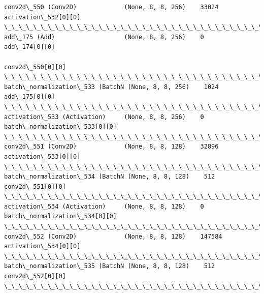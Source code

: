 \documentclass[11pt]{article}
\begin{document}
\begin{Verbatim}[commandchars=\\\{\}]
conv2d\_550 (Conv2D)             (None, 8, 8, 256)    33024       activation\_532[0][0]             
\_\_\_\_\_\_\_\_\_\_\_\_\_\_\_\_\_\_\_\_\_\_\_\_\_\_\_\_\_\_\_\_\_\_\_\_\_\_\_\_\_\_\_\_\_\_\_\_\_\_\_\_\_\_\_\_\_\_\_\_\_\_\_\_\_\_\_\_\_\_\_\_\_\_\_\_\_\_\_\_\_\_\_\_\_\_\_\_\_\_\_\_\_\_\_\_\_\_
add\_175 (Add)                   (None, 8, 8, 256)    0           add\_174[0][0]                    
                                                                 conv2d\_550[0][0]                 
\_\_\_\_\_\_\_\_\_\_\_\_\_\_\_\_\_\_\_\_\_\_\_\_\_\_\_\_\_\_\_\_\_\_\_\_\_\_\_\_\_\_\_\_\_\_\_\_\_\_\_\_\_\_\_\_\_\_\_\_\_\_\_\_\_\_\_\_\_\_\_\_\_\_\_\_\_\_\_\_\_\_\_\_\_\_\_\_\_\_\_\_\_\_\_\_\_\_
batch\_normalization\_533 (BatchN (None, 8, 8, 256)    1024        add\_175[0][0]                    
\_\_\_\_\_\_\_\_\_\_\_\_\_\_\_\_\_\_\_\_\_\_\_\_\_\_\_\_\_\_\_\_\_\_\_\_\_\_\_\_\_\_\_\_\_\_\_\_\_\_\_\_\_\_\_\_\_\_\_\_\_\_\_\_\_\_\_\_\_\_\_\_\_\_\_\_\_\_\_\_\_\_\_\_\_\_\_\_\_\_\_\_\_\_\_\_\_\_
activation\_533 (Activation)     (None, 8, 8, 256)    0           batch\_normalization\_533[0][0]    
\_\_\_\_\_\_\_\_\_\_\_\_\_\_\_\_\_\_\_\_\_\_\_\_\_\_\_\_\_\_\_\_\_\_\_\_\_\_\_\_\_\_\_\_\_\_\_\_\_\_\_\_\_\_\_\_\_\_\_\_\_\_\_\_\_\_\_\_\_\_\_\_\_\_\_\_\_\_\_\_\_\_\_\_\_\_\_\_\_\_\_\_\_\_\_\_\_\_
conv2d\_551 (Conv2D)             (None, 8, 8, 128)    32896       activation\_533[0][0]             
\_\_\_\_\_\_\_\_\_\_\_\_\_\_\_\_\_\_\_\_\_\_\_\_\_\_\_\_\_\_\_\_\_\_\_\_\_\_\_\_\_\_\_\_\_\_\_\_\_\_\_\_\_\_\_\_\_\_\_\_\_\_\_\_\_\_\_\_\_\_\_\_\_\_\_\_\_\_\_\_\_\_\_\_\_\_\_\_\_\_\_\_\_\_\_\_\_\_
batch\_normalization\_534 (BatchN (None, 8, 8, 128)    512         conv2d\_551[0][0]                 
\_\_\_\_\_\_\_\_\_\_\_\_\_\_\_\_\_\_\_\_\_\_\_\_\_\_\_\_\_\_\_\_\_\_\_\_\_\_\_\_\_\_\_\_\_\_\_\_\_\_\_\_\_\_\_\_\_\_\_\_\_\_\_\_\_\_\_\_\_\_\_\_\_\_\_\_\_\_\_\_\_\_\_\_\_\_\_\_\_\_\_\_\_\_\_\_\_\_
activation\_534 (Activation)     (None, 8, 8, 128)    0           batch\_normalization\_534[0][0]    
\_\_\_\_\_\_\_\_\_\_\_\_\_\_\_\_\_\_\_\_\_\_\_\_\_\_\_\_\_\_\_\_\_\_\_\_\_\_\_\_\_\_\_\_\_\_\_\_\_\_\_\_\_\_\_\_\_\_\_\_\_\_\_\_\_\_\_\_\_\_\_\_\_\_\_\_\_\_\_\_\_\_\_\_\_\_\_\_\_\_\_\_\_\_\_\_\_\_
conv2d\_552 (Conv2D)             (None, 8, 8, 128)    147584      activation\_534[0][0]             
\_\_\_\_\_\_\_\_\_\_\_\_\_\_\_\_\_\_\_\_\_\_\_\_\_\_\_\_\_\_\_\_\_\_\_\_\_\_\_\_\_\_\_\_\_\_\_\_\_\_\_\_\_\_\_\_\_\_\_\_\_\_\_\_\_\_\_\_\_\_\_\_\_\_\_\_\_\_\_\_\_\_\_\_\_\_\_\_\_\_\_\_\_\_\_\_\_\_
batch\_normalization\_535 (BatchN (None, 8, 8, 128)    512         conv2d\_552[0][0]                 
\_\_\_\_\_\_\_\_\_\_\_\_\_\_\_\_\_\_\_\_\_\_\_\_\_\_\_\_\_\_\_\_\_\_\_\_\_\_\_\_\_\_\_\_\_\_\_\_\_\_\_\_\_\_\_\_\_\_\_\_\_\_\_\_\_\_\_\_\_\_\_\_\_\_\_\_\_\_\_\_\_\_\_\_\_\_\_\_\_\_\_\_\_\_\_\_\_\_

\end{Verbatim}
\end{document}
